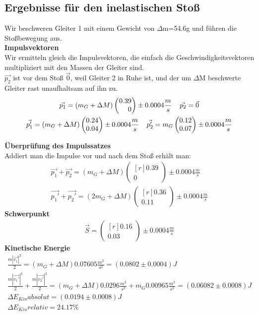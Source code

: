 \documentclass{article}
\begin{document}
\subsection{Ergebnisse für den inelastischen Stoß}
Wir beschweren Gleiter 1 mit einem Gewicht von $\Delta$m=54.6g und führen die Stoßbewegung aus. \\
\textbf{Impulsvektoren}\\
Wir ermitteln gleich die Impulsvektoren, die einfach die Geschwindigkeitsvektoren multipliziert mit den Massen der Gleiter sind. \\
$\vec{p_2}$ ist vor dem Stoß $\vec{0}$, weil Gleiter 2 in Ruhe ist, und der um $\Delta$M beschwerte Gleiter rast unaufhaltsam auf ihn zu.
\begin{gather*}
\vec{p_1}=(m_G+\Delta M)
\begin{pmatrix*}[r]
0.39 \\ 0
\end{pmatrix*}\pm 0.0004 \frac{m}{s} \hspace{0.4cm}
\vec{p_2}=\vec{0} \\
\vec{p_1'}=
(m_G+\Delta M)\begin{pmatrix*}[r]
0.24 \\ 0.04
\end{pmatrix*} \pm 0.0004  \frac{m}{s}\hspace{0.4cm}
\vec{p_2'}=m_G\begin{pmatrix*}[r]
0.12 \\ 0.07
\end{pmatrix*} \pm 0.0004  \frac{m}{s}
\end{gather*}

\textbf{Überprüfung des Impulssatzes} \\
Addiert man die Impulse vor und nach dem Stoß erhält man:
\begin{gather*}
\vec{p_1}+\vec{p_2}=(m_G+\Delta M)
\begin{pmatrix*}[r]
0.39 \\ 0
\end{pmatrix*}\pm 0.0004 \frac{m}{s} \\
\vec{p_1'}+\vec{p_2'}=(2m_G+\Delta M)
\begin{pmatrix*}[r]
0.36 \\ 0.11
\end{pmatrix*}\pm 0.0004  \frac{m}{s}
\end{gather*}
\textbf{Schwerpunkt}
\begin{gather*}
\vec{S}=
\begin{pmatrix*}[r]
0.16 \\ 0.03
\end{pmatrix*} \pm 0.0004 \frac{m}{s}
\end{gather*}
\textbf{Kinetische Energie}
\begin{gather*}
\frac{m|\vec{v_1}|^2}{2}=(m_G+\Delta M)0.07605\frac{m^2}{s^2}=(0.0802 \pm 0.0004)J \\
\frac{m|\vec{v_1'}|^2}{2}+\frac{m|\vec{v_2'}|^2}{2}=(m_G+\Delta M)0.0296\frac{m^2}{s^2} + m_G0.00965\frac{m^2}{s^2}=(0.06082 \pm 0.0008) J \\
\Delta E_{Kin} absolut=(0.0194 \pm 0.0008) J \\
\Delta E_{Kin}relativ=24.17\%
\end{gather*}
\end{document}
